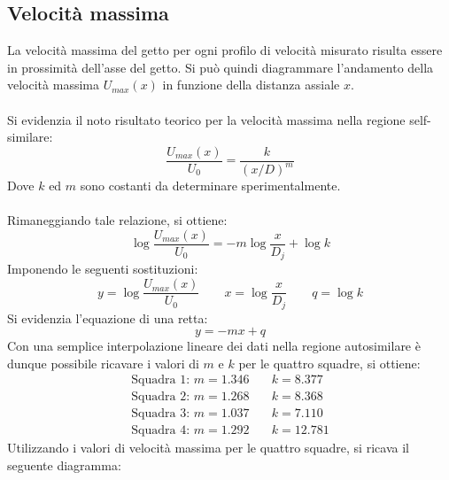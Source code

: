 \subsection{Velocità massima}
La velocità massima del getto per ogni profilo di velocità misurato risulta essere in prossimità dell'asse del getto. Si può quindi diagrammare l'andamento della velocità massima $U_{max}(x)$ in funzione della distanza assiale $x$.\\\\
Si evidenzia il noto risultato teorico per la velocità massima nella regione self-similare:
\begin{equation*}
    \frac{U_{max}(x)}{U_0} = \frac{k}{(x/D)^m}
\end{equation*}
Dove $k$ ed $m$ sono costanti da determinare sperimentalmente.\\\\
Rimaneggiando tale relazione, si ottiene:
\begin{equation*}
    \log \frac{U_{max}(x)}{U_0} = -m \log\frac{x}{D_j} + \log k
\end{equation*}
Imponendo le seguenti sostituzioni:
\begin{equation*}
    y = \log \frac{U_{max}(x)}{U_0} \qquad x = \log\frac{x}{D_j} \qquad q = \log k
\end{equation*}
Si evidenzia l'equazione di una retta:
\begin{equation*}
    y = -mx + q
\end{equation*}
Con una semplice interpolazione lineare dei dati nella regione autosimilare è dunque possibile ricavare i valori di $m$ e $k$ per le quattro squadre, si ottiene:
\begin{equation*}
    \begin{split}
        \text{Squadra 1: } m = 1.346 &\quad k = 8.377\\
        \text{Squadra 2: } m = 1.268 &\quad k = 8.368\\
        \text{Squadra 3: } m = 1.037 &\quad k = 7.110\\
        \text{Squadra 4: } m = 1.292 &\quad k = 12.781
    \end{split}
\end{equation*}
Utilizzando i valori di velocità massima per le quattro squadre, si ricava il seguente diagramma:
